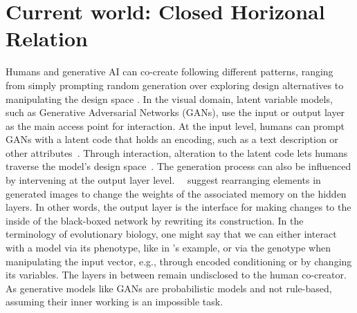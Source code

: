 \documentclass[manuscript]{acmart}
\begin{document}
\section{Current world: Closed Horizonal Relation}
Humans and generative AI can co-create following different patterns, %
ranging from simply prompting random generation over exploring design alternatives to manipulating the design space \cite{muller_mixed_2020,grabe_towards_2022,bau_rewriting_2020}. 
In the visual domain, latent variable models, such as Generative Adversarial Networks (GANs), use the input or output layer as the main access point for interaction. 
At the input level, humans can prompt GANs with a latent code that holds an encoding, such as a text description or other attributes~\cite{yildirim_disentangling_2018,zhu_be_2017}. Through interaction, alteration to the latent code lets humans traverse the model's design space~\cite{schrum_interactive_2020}. The generation process can also be influenced by intervening at the output layer level. \citeauthor{bau_rewriting_2020}~\cite{bau_rewriting_2020}~suggest rearranging elements in generated images to change the weights of the associated memory on the hidden layers. In other words, the output layer is the interface for making changes to the inside of the black-boxed network by rewriting its construction. 
%
In the terminology of evolutionary biology, one might say that we can either interact with a model via its phenotype, like in \citeauthor{bau_rewriting_2020}'s example, 
or via the genotype when manipulating the input vector, e.g., through encoded conditioning or by changing its variables. 
The layers in between remain undisclosed to the human co-creator. As generative models like GANs are probabilistic models and not rule-based, assuming their inner working is an impossible task.
\end{document}
